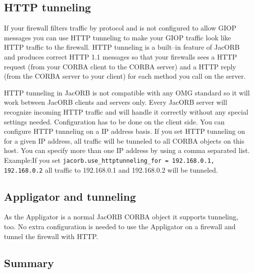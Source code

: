 \documentclass[12pt]{scrbook}
\begin{document}
\subsection{HTTP tunneling}

If your firewall filters traffic  by protocol and is not configured to
allow  GIOP messages  you can  use HTTP  tunneling to  make  your GIOP
traffic look  like HTTP traffic to  the firewall. HTTP  tunneling is a
built--in feature of  JacORB and produces correct HTTP  1.1 messages so
that your firewalls sees a HTTP request (from your CORBA client to the
CORBA server) and a HTTP reply  (from the CORBA server to your client)
for each method  you call on the server.  

HTTP tunneling in JacORB is not compatible with any OMG standard so it
will  work between  JacORB  clients and  servers  only.  Every  JacORB
server  will  recognize  incoming  HTTP  traffic and  will  handle  it
correctly without  any special settings needed.   Configuration has to
be done on the client side.   You can configure HTTP tunneling on a IP
address basis.  If  you set HTTP tunneling on for  a given IP address,
all traffic will  be tunneled to all CORBA objects  on this host.  You
can specify more than one IP  address by using a comma separated list.
Example:If you set  {\tt jacorb.use\_httptunneling\_for = 192.168.0.1,
192.168.0.2}  all  traffic  to  192.168.0.1 and  192.168.0.2  will  be
tunneled.


\subsection{Appligator and tunneling}

As  the  Appligator  is  a  normal JacORB  CORBA  object  it  supports
tunneling,  too.   No  extra   configuration  is  needed  to  use  the
Appligator on a firewall and tunnel the firewall with HTTP.

\subsection{Summary}
\end{document}
